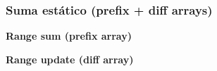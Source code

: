 \subsubsection{Suma estático (prefix + diff arrays)}
    \textbf{Range sum (prefix array)}
    

    \textbf{Range update (diff array)}
    

